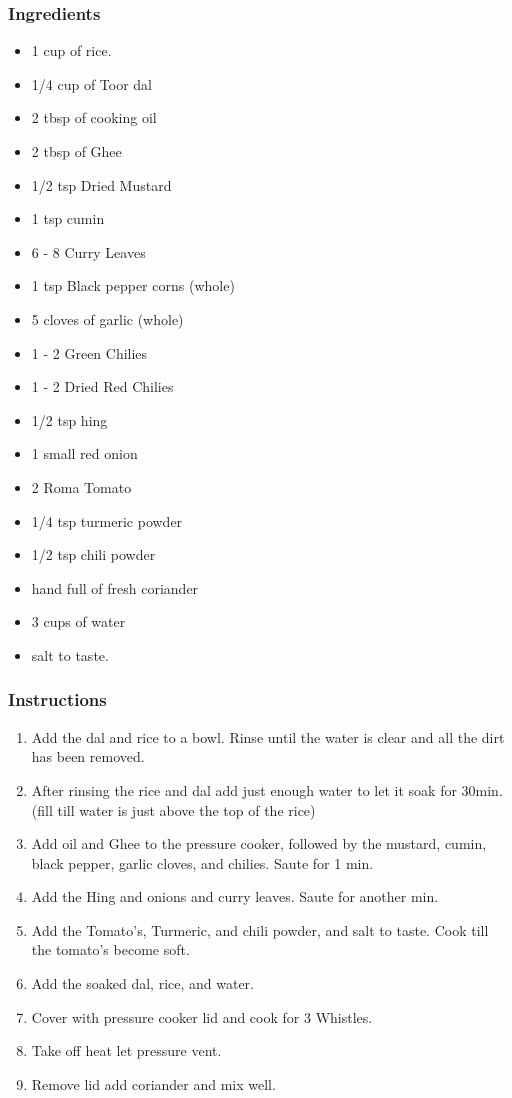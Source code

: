 \documentclass[11pt]{article}
\begin{document}
\subsubsection*{Ingredients}
\label{sec:org7485571}
\begin{itemize}
\item 1 cup of rice.
\item 1/4 cup of Toor dal
\item 2 tbsp of cooking oil
\item 2 tbsp of Ghee
\item 1/2 tsp Dried Mustard
\item 1 tsp cumin
\item 6 - 8 Curry Leaves
\item 1 tsp Black pepper corns (whole)
\item 5 cloves of garlic (whole)
\item 1 - 2 Green Chilies
\item 1 - 2 Dried Red Chilies
\item 1/2 tsp hing
\item 1 small red onion
\item 2 Roma Tomato
\item 1/4 tsp turmeric powder
\item 1/2 tsp chili powder
\item hand full of fresh coriander
\item 3 cups of water
\item salt to taste.
\end{itemize}
\subsubsection*{Instructions}
\label{sec:org3d7125f}
\begin{enumerate}
\item Add the dal and rice to a bowl. Rinse until the water is clear and all the dirt has been removed.
\item After rinsing the rice and dal add just enough water to let it soak for 30min. (fill till water is just above the top of the rice)
\item Add oil and Ghee to the pressure cooker, followed by the mustard, cumin, black pepper, garlic cloves, and chilies. Saute for 1 min.
\item Add the Hing and onions and curry leaves. Saute for another min.
\item Add the Tomato's, Turmeric, and chili powder, and salt to taste. Cook till the tomato's become soft.
\item Add the soaked dal, rice, and water.
\item Cover with pressure cooker lid and cook for 3 Whistles.
\item Take off heat let pressure vent.
\item Remove lid add coriander and mix well.
\end{enumerate}
\end{document}
